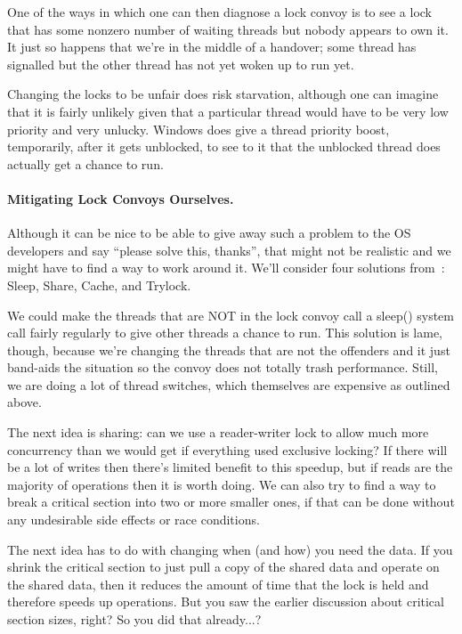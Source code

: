 \documentclass[a4paper]{report}
\begin{document}
One of the ways in which one can then diagnose a lock convoy is to see a lock that has some nonzero number of waiting threads but nobody appears to own it. It just so happens that we're in the middle of a handover; some thread has signalled but the other thread has not yet woken up to run yet.

Changing the locks to be unfair does risk starvation, although one can imagine that it is fairly unlikely given that a particular thread would have to be very low priority and very unlucky. Windows does give a thread priority boost, temporarily, after it gets unblocked, to see to it that the unblocked thread does actually get a chance to run.

\paragraph{Mitigating Lock Convoys Ourselves.} Although it can be nice to be able to give away such a problem to the OS developers and say ``please solve this, thanks'', that might not be realistic and we might have to find a way to work around it. We'll consider four solutions from~\cite{lockconvoys}: Sleep, Share, Cache, and Trylock.

We could make the threads that are NOT in the lock convoy call a sleep() system call fairly regularly to give other threads a chance to run. This solution is lame, though, because we're changing the threads that are not the offenders and it just band-aids the situation so the convoy does not totally trash performance. Still, we are doing a lot of thread switches, which themselves are expensive as outlined above.

The next idea is sharing: can we use a reader-writer lock to allow much more concurrency than we would get if everything used exclusive locking? If there will be a lot of writes then there's limited benefit to this speedup, but if reads are the majority of operations then it is worth doing. We can also try to find a way to break a critical section into two or more smaller ones, if that can be done without any undesirable side effects or race conditions.

The next idea has to do with changing when (and how) you need the data. If you shrink the critical section to just pull a copy of the shared data and operate on the shared data, then it reduces the amount of time that the lock is held and therefore speeds up operations. But you saw the earlier discussion about critical section sizes, right? So you did that already...?
\end{document}
